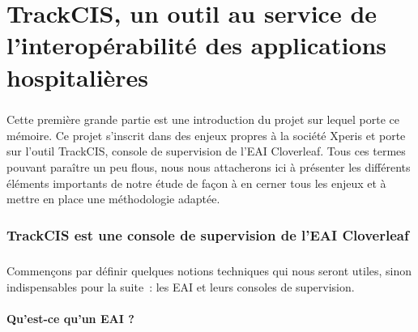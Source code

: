 \chapter{TrackCIS, un outil au service de l'interopérabilité des applications
hospitalières}
	\paragraph{}
	Cette première grande partie est une introduction du projet sur lequel porte ce
	mémoire. Ce projet s'inscrit dans des enjeux propres à la société Xperis et
	porte sur l'outil TrackCIS, console de supervision de l'EAI Cloverleaf. Tous
	ces termes pouvant paraître un peu flous, nous nous attacherons ici à présenter
	les différents éléments importants de notre étude de façon à en cerner tous
	les enjeux et à mettre en place une méthodologie adaptée.

	\subsection{TrackCIS est une console de supervision de l'EAI Cloverleaf}
		\paragraph{}
		Commençons par définir quelques notions techniques qui nous seront utiles,
		sinon indispensables pour la suite~: les EAI et leurs consoles de supervision.
		
		\subsubsection{Qu'est-ce qu'un EAI ?}
